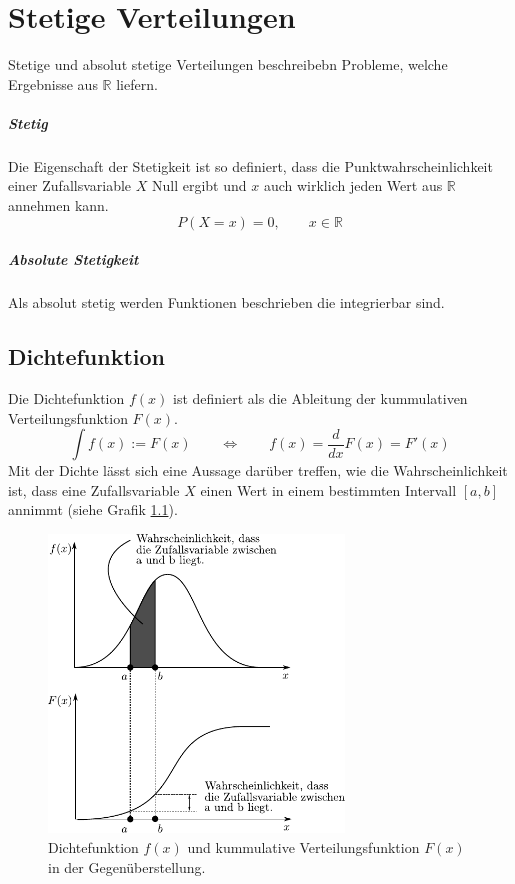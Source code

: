 \chapter{Stetige Verteilungen}
Stetige und absolut stetige Verteilungen beschreibebn Probleme, 
welche Ergebnisse aus $\mathbb{R}$ liefern.

\paragraph{Stetig} Die Eigenschaft der Stetigkeit ist so definiert,
dass die Punktwahrscheinlichkeit einer Zufallsvariable 
$X$ Null ergibt und $x$ auch wirklich jeden Wert aus
$\mathbb{R}$ annehmen kann.
\[ 
	P(X=x) = 0, \qquad x\in\mathbb{R}
\]
\paragraph{Absolute Stetigkeit}
Als absolut stetig werden Funktionen beschrieben die integrierbar 
sind. 

\newpage

\section{Dichtefunktion}
Die Dichtefunktion $f(x)$ ist definiert als die Ableitung der kummulativen
Verteilungsfunktion $F(x)$.
\[  
	\int f(x) := F(x) 
		\qquad 
		\Leftrightarrow 
		\qquad 
		f(x) = \frac{d}{dx} F(x)
		= F'(x)
\]
Mit der Dichte lässt sich eine Aussage darüber treffen, wie die 
Wahrscheinlichkeit ist, dass eine Zufallsvariable $X$ einen Wert
in einem bestimmten Intervall $[a,b]$ annimmt (siehe Grafik 
\ref{fig:dichte}).

\begin{figure}[h!]
	\centering
	\includegraphics[width=0.7\textwidth]{dichtefunktion.pdf}
	\caption{Dichtefunktion $f(x)$ und kummulative Verteilungsfunktion 
		$F(x)$ in der Gegenüberstellung.}
	\label{fig:dichte}
\end{figure}

